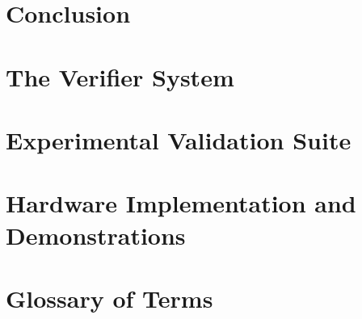 \documentclass[9pt, a4paper, oneside, twocolumn]{extreport}
\theoremstyle{plain}
\theoremstyle{definition}
\theoremstyle{remark}
\begin{document}
\chapter{Conclusion}


\appendix

\chapter{The Verifier System}


\chapter{Experimental Validation Suite}


\chapter{Hardware Implementation and Demonstrations}


\chapter{Glossary of Terms}




\end{document}
